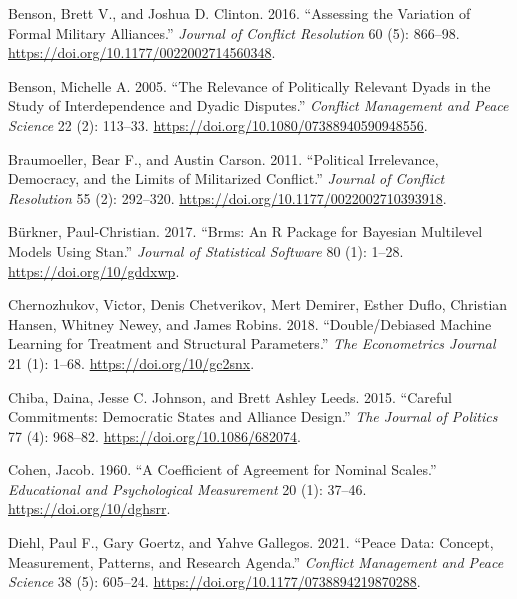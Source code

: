 \documentclass[
  letterpaper,
  DIV=11,
  numbers=noendperiod]{scrartcl}
\newlength{\cslhangindent}
\newenvironment{CSLReferences}[2] %
 {\begin{list}{}{%
  \setlength{\itemindent}{0pt}
  \setlength{\leftmargin}{0pt}
  \setlength{\parsep}{0pt}
  \ifodd #1
   \setlength{\leftmargin}{\cslhangindent}
   \setlength{\itemindent}{-1\cslhangindent}
  \fi
  \setlength{\itemsep}{#2\baselineskip}}}
 {\end{list}}
\begin{document}
\begin{CSLReferences}{1}{0}
Benson, Brett V., and Joshua D. Clinton. 2016. {``Assessing the
{Variation} of {Formal Military Alliances}.''} \emph{Journal of Conflict
Resolution} 60 (5): 866--98.
\url{https://doi.org/10.1177/0022002714560348}.

Benson, Michelle A. 2005. {``The {Relevance} of {Politically Relevant
Dyads} in the {Study} of {Interdependence} and {Dyadic Disputes}.''}
\emph{Conflict Management and Peace Science} 22 (2): 113--33.
\url{https://doi.org/10.1080/07388940590948556}.

Braumoeller, Bear F., and Austin Carson. 2011. {``Political
{Irrelevance}, {Democracy}, and the {Limits} of {Militarized
Conflict}.''} \emph{Journal of Conflict Resolution} 55 (2): 292--320.
\url{https://doi.org/10.1177/0022002710393918}.

Bürkner, Paul-Christian. 2017. {``Brms: {An R Package} for {Bayesian
Multilevel Models Using Stan}.''} \emph{Journal of Statistical Software}
80 (1): 1--28. \url{https://doi.org/10/gddxwp}.

Chernozhukov, Victor, Denis Chetverikov, Mert Demirer, Esther Duflo,
Christian Hansen, Whitney Newey, and James Robins. 2018.
{``Double/Debiased Machine Learning for Treatment and Structural
Parameters.''} \emph{The Econometrics Journal} 21 (1): 1--68.
\url{https://doi.org/10/gc2snx}.

Chiba, Daina, Jesse C. Johnson, and Brett Ashley Leeds. 2015. {``Careful
{Commitments}: {Democratic States} and {Alliance Design}.''} \emph{The
Journal of Politics} 77 (4): 968--82.
\url{https://doi.org/10.1086/682074}.

Cohen, Jacob. 1960. {``A {Coefficient} of {Agreement} for {Nominal
Scales}.''} \emph{Educational and Psychological Measurement} 20 (1):
37--46. \url{https://doi.org/10/dghsrr}.

Diehl, Paul F., Gary Goertz, and Yahve Gallegos. 2021. {``Peace Data:
{Concept}, Measurement, Patterns, and Research Agenda.''} \emph{Conflict
Management and Peace Science} 38 (5): 605--24.
\url{https://doi.org/10.1177/0738894219870288}.


\end{CSLReferences}
\end{document}
